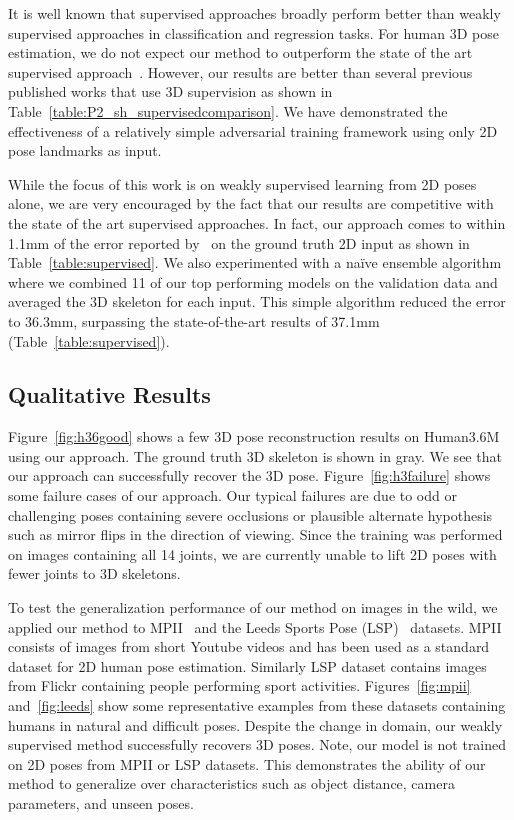 \documentclass[runningheads]{llncs}
\begin{document}
It is well known that supervised approaches broadly perform better than weakly supervised approaches in classification and regression tasks. For human 3D pose estimation, we do not expect our method to outperform the state of the art supervised approach~\cite{MartinezICCV2017}. However, our results are better than several previous published works that use 3D supervision as shown in Table~\ref{table:P2_sh_supervisedcomparison}. We have demonstrated the effectiveness of a relatively simple adversarial training framework using only 2D pose landmarks as input.

While the focus of this work is on weakly supervised learning from 2D poses alone, we are very encouraged {by the fact} that our results are competitive with the state of the art supervised approaches. In fact, our approach comes to within 1.1mm of the error reported by~\cite{MartinezICCV2017} on the ground truth 2D input as shown in Table~\ref{table:supervised}. We also experimented with a na\"ive ensemble algorithm where we combined 11 of our top performing models on the validation data and averaged the 3D skeleton for each input. This simple algorithm reduced the error to 36.3mm, surpassing the state-of-the-art results of 37.1mm (Table~\ref{table:supervised}). %

\subsection{Qualitative Results}
Figure~\ref{fig:h36good} shows a few 3D pose reconstruction results on Human3.6M using our approach. The ground truth 3D skeleton is shown in gray. We see that our approach can successfully recover the 3D pose. Figure~\ref{fig:h3failure} shows some failure cases of our approach. Our typical failures are due to odd or challenging poses containing severe occlusions or plausible alternate hypothesis such as mirror flips in the direction of viewing. Since the training was performed on images containing all 14 joints, we are currently unable to lift 2D poses with fewer joints to 3D skeletons.

To test the generalization performance of our method on images in the wild, we applied our method to MPII~\cite{andriluka14cvpr} and the Leeds Sports Pose (LSP)~\cite{johnson2010clustered} datasets. MPII consists of images from short Youtube videos and has been used as a standard dataset for 2D human pose estimation. Similarly LSP dataset contains images from Flickr containing people performing sport activities. Figures~\ref{fig:mpii} and~\ref{fig:leeds} show some representative examples from these datasets containing humans in natural and difficult poses. Despite the change in domain, our weakly supervised method successfully recovers 3D poses. Note, our model is not trained on 2D poses from MPII or LSP datasets. This demonstrates the ability of our method to generalize over characteristics such as object distance, camera parameters, and unseen poses.
\end{document}
